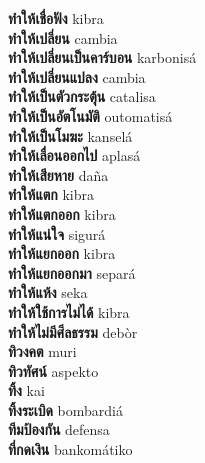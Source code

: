 \textbf{ ทำให้เชื่อฟัง  } kibra \\
\textbf{ ทำให้เปลี่ยน  } cambia \\
\textbf{ ทำให้เปลี่ยนเป็นคาร์บอน  } karbonisá \\
\textbf{ ทำให้เปลี่ยนแปลง  } cambia \\
\textbf{ ทำให้เป็นตัวกระตุ้น  } catalisa \\
\textbf{ ทำให้เป็นอัตโนมัติ  } outomatisá \\
\textbf{ ทำให้เป็นโมฆะ  } kanselá \\
\textbf{ ทำให้เลื่อนออกไป  } aplasá \\
\textbf{ ทำให้เสียหาย  } daña \\
\textbf{ ทำให้แตก  } kibra \\
\textbf{ ทำให้แตกออก  } kibra \\
\textbf{ ทำให้แน่ใจ  } sigurá \\
\textbf{ ทำให้แยกออก  } kibra \\
\textbf{ ทำให้แยกออกมา  } separá \\
\textbf{ ทำให้แห้ง  } seka \\
\textbf{ ทำให้ใช้การไม่ได้  } kibra \\
\textbf{ ทำให้ไม่มีศีลธรรม  } debòr \\
\textbf{ ทิวงคต  } muri \\
\textbf{ ทิวทัศน์  } aspekto \\
\textbf{ ทิ้ง  } kai \\
\textbf{ ทิ้งระเบิด  } bombardiá \\
\textbf{ ทีมป้องกัน  } defensa \\
\textbf{ ที่กดเงิน  } bankomátiko \\
